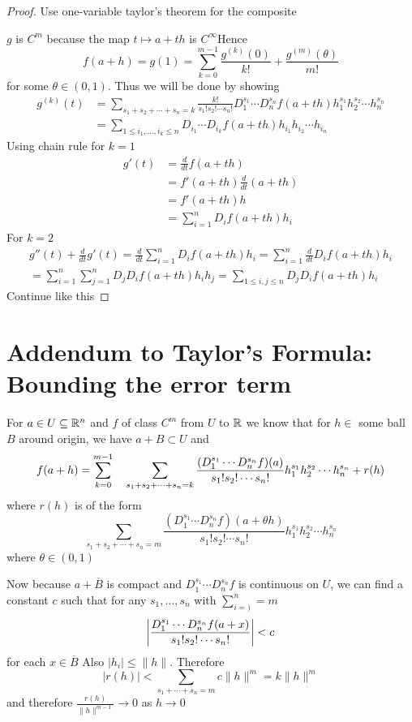 \begin{proof}
	Use one-variable taylor's theorem for the composite 
	
	\begin{center}
	\end{center}$g$ is $C^m$ because the map $t\mapsto a+th$ is $C^{\infty}$Hence $$f(a+h)=g(1)=\sum_{k=0}^{m-1}\frac{g^{(k)}(0)}{k!}+\frac{g^{(m)}(\theta)}{m!}$$for some $\theta\in (0,1)$. Thus we will be done by showing \begin{align*}
	g^{(k)}(t) &=\sum_{s_1+s_2+\cdots+s_n=k} \frac{k!}{s_1!s_2!\cdots s_n!}D_1^{s_1}\cdots D_n^{s_n}f(a+th)h_1^{s_1}h_2^{s_2}\cdots h_n^{s_n}\\
	&=\sum_{1\leq i_1,\dots,i_k\leq n}D_{i_1}\cdots D_{i_k}f(a+th)h_{i_1}h_{i_2}\cdots h_{i_n}
\end{align*}
Using chain rule for $k=1$ \begin{align*}
	g'(t) & =\frac{d}{dt}f(a+th)\\
	 &= f'(a+th)\frac{d}{dt}(a+th)\\
	 &=f'(a+th)h\\
	 &=\sum_{i=1}^nD_if(a+th)h_i
\end{align*}For $k=2$ \begin{multline*}
g''(t)+\frac{d}{dt}g'(t)=\frac{d}{dt}\sum_{i=1}^nD_if(a+th)h_i=\sum_{i=1}^n\frac{d}{dt}D_if(a+th)h_i\\
=\sum_{i=1}^n\sum_{j=1}^nD_jD_if(a+th)h_ih_j=\sum_{1\leq i,j\leq n}D_jD_if(a+th)h_i
\end{multline*}Continue like this
\end{proof}
\section*{Addendum to Taylor's Formula: Bounding the error term}
For $a\in U\subseteq \mathbb{R}^n$ and $f$ of class $C^m$ from $U$ to $\mathbb{R}$ we know that  for $h\in $ some ball $B$ around origin, we have $a+B\subset U$ and $$f(a+h)=\sum_{k=0}^{m-1}\quad \sum_{s_1+s_2+\cdots+s_n=k} \frac{(D_1^{s_1}\cdots D_n^{s_n}f)(a)}{s_1!s_2!\cdots s_n!}h_1^{s_1}h_2^{s_2}\cdots h_n^{s_n}+\EqM{r}{r(h)}$$where $r(h)$ is of the form $$\sum_{s_1+s_2+\cdots+s_n=m} \frac{(D_1^{s_1}\cdots D_n^{s_n}f)(a+\theta h)}{s_1!s_2!\cdots s_n!}h_1^{s_1}h_2^{s_2}\cdots h_n^{s_n}$$ where $\theta\in (0,1)$

Now because $a+\overline{B}$ is compact and $D_1^{s_1}\cdots D_n^{s_n}f$ is continuous  on $U$, we can find a constant $c$ such that for any $s_1,\dots,s_n$ with $\sum\limits_{i=)}^n =m$ $$\left| \frac{D_1^{s_1}\cdots D_n^{s_n}f(a+x)}{s_1!s_2!\cdots s_n!}\right|<c$$for each $x\in \overline{B}$ Also $|h_i|\leq \|h\|$. Therefore $$|r(h)|<\sum_{s_1+\cdots+s_n=m}c\|h\|^m=k\|h\|^m$$and therefore $\frac{r(h)}{\|h\|^{m-1}}\to 0$ as $h\to 0$
